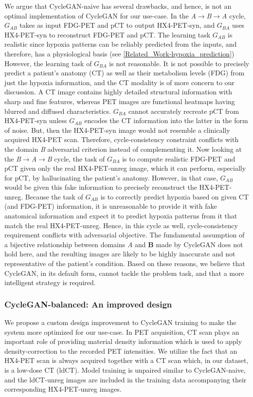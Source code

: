 We argue that CycleGAN-naive has several drawbacks, and hence, is not an optimal implementation of CycleGAN for our use-case. In the \textit{A}$\rightarrow$\textit{B}$\rightarrow$\textit{A} cycle, $G_{AB}$ takes as input FDG-PET and pCT to output HX4-PET-syn, and $G_{BA}$ uses HX4-PET-syn to reconstruct FDG-PET and pCT. The learning task $G_{AB}$ is realistic since hypoxia patterns can be reliably predicted from the inputs, and therefore, has a physiological basis (see \ref{Related_Work-hypoxia_prediction}) However, the learning task of $G_{BA}$ is not reasonable. It is not possible to precisely predict a patient's anatomy (CT) as well as their metabolism levels (FDG) from just the hypoxia information, and the CT modality is of more concern to our discussion. A CT image contains highly detailed structural information with sharp and fine features, whereas PET images are functional heatmaps having blurred and diffused characteristics. $G_{BA}$ cannot accurately recreate pCT from HX4-PET-syn unless $G_{AB}$ encodes the CT information into the latter in the form of noise. But, then the HX4-PET-syn image would not resemble a clinically acquired HX4-PET scan. Therefore, cycle-consistency constraint conflicts with the domain \textit{B} adversarial criterion instead of complementing it. Now looking at the \textit{B}$\rightarrow$\textit{A}$\rightarrow$\textit{B} cycle, the task of $G_{BA}$ is to compute realistic FDG-PET and pCT given only the real HX4-PET-unreg image, which it can perform, especially for pCT, by hallucinating the patient's anatomy. However, in that case, $G_{AB}$ would be given this fake information to precisely reconstruct the HX4-PET-unreg. Because the task of $G_{AB}$ is to correctly predict hypoxia based on given CT (and FDG-PET) information, it is unreasonable to provide it with fake anatomical information and expect it to predict hypoxia patterns from it that match the real HX4-PET-unreg. Hence, in this cycle as well, cycle-consistency requirement conflicts with adversarial objective. The fundamental assumption of a bijective relationship between domains \textit{A} and \textbf{B} made by CycleGAN does not hold here, and the resulting images are likely to be highly inaccurate and not representative of the patient's condition. Based on these reasons, we believe that CycleGAN, in its default form, cannot tackle the problem task, and that a more intelligent strategy is required.

\subsubsection{CycleGAN-balanced: An improved design}
We propose a custom design improvement to CycleGAN training to make the system more optimized for our use-case. In PET acquisition, CT scan plays an important role of providing material density information which is used to apply density-correction to the recorded PET intensities. We utilize the fact that an HX4-PET scan is always acquired together with a CT scan which, in our dataset, is a low-dose CT (ldCT). Model training is unpaired similar to CycleGAN-naive, and the ldCT-unreg images are included in the training data accompanying their corresponding HX4-PET-unreg images. 

